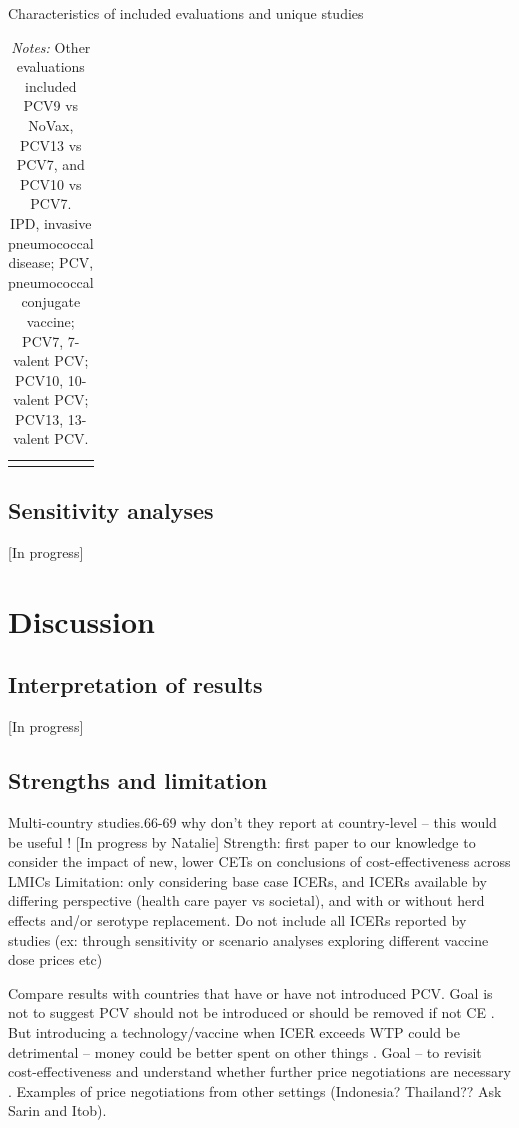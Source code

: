 \documentclass[12pt]{article}
\begin{document}
\begin{table}[H]
    \centering \singlespacing \small
    \caption{Characteristics of included evaluations and unique studies}
    \begin{tabular}{|L{4.5cm}|L{4cm}|C{2.75cm}|C{2.75cm}|}
        \hline
    \end{tabular}
    \label{tab_likely_anyswitch}
    \caption*{\footnotesize \textit{Notes:} Other evaluations included PCV9 vs NoVax, PCV13 vs PCV7, and PCV10 vs PCV7. \\
    IPD, invasive pneumococcal disease; PCV, pneumococcal conjugate vaccine; PCV7, 7-valent PCV; PCV10, 10-valent PCV; PCV13, 13-valent PCV. 
}
\end{table}




\subsection{Sensitivity analyses}
[In progress]


\section{Discussion}
\subsection{Interpretation of results}
[In progress]

\subsection{Strengths and limitation}
Multi-country studies.66-69 why don't they report at country-level – this would be useful !
[In progress by Natalie]
Strength: first paper to our knowledge to consider the impact of new, lower CETs on conclusions of cost-effectiveness across LMICs
Limitation: only considering base case ICERs, and ICERs available by differing perspective (health care payer vs societal), and with or without herd effects and/or serotype replacement.
Do not include all ICERs reported by studies (ex: through sensitivity or scenario analyses exploring different vaccine dose prices etc)

Compare results with countries that have or have not introduced PCV. Goal is not to suggest PCV should not be introduced or should be removed if not CE . But introducing a technology/vaccine when ICER exceeds WTP could be detrimental – money could be better spent on other things .
Goal – to revisit cost-effectiveness and understand whether further price negotiations are necessary . Examples of price negotiations from other settings (Indonesia? Thailand?? Ask Sarin and Itob). 
\end{document}
